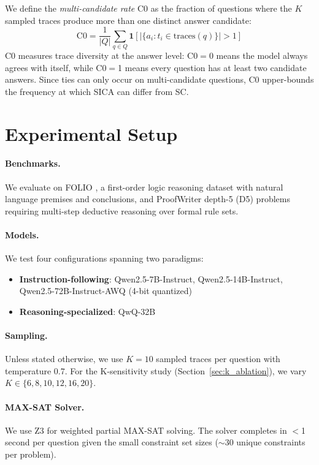 \documentclass[11pt,a4paper]{article}
\begin{document}
We define the \emph{multi-candidate rate} C0 as the fraction of questions where the $K$ sampled traces produce more than one distinct answer candidate:
\begin{equation}
    \text{C0} = \frac{1}{|Q|} \sum_{q \in Q} \mathbf{1}\left[|\{a_i : t_i \in \text{traces}(q)\}| > 1\right]
\end{equation}
C0 measures trace diversity at the answer level: C0$=$0 means the model always agrees with itself, while C0$=$1 means every question has at least two candidate answers. Since ties can only occur on multi-candidate questions, C0 upper-bounds the frequency at which SICA can differ from SC.

\section{Experimental Setup}
\label{sec:setup}

\paragraph{Benchmarks.} We evaluate on FOLIO \cite{han2022folio}, a first-order logic reasoning dataset with natural language premises and conclusions, and ProofWriter \cite{tafjord2021proofwriter} depth-5 (D5) problems requiring multi-step deductive reasoning over formal rule sets.

\paragraph{Models.} We test four configurations spanning two paradigms:
\begin{itemize}
    \item \textbf{Instruction-following}: Qwen2.5-7B-Instruct, Qwen2.5-14B-Instruct, Qwen2.5-72B-Instruct-AWQ (4-bit quantized)
    \item \textbf{Reasoning-specialized}: QwQ-32B
\end{itemize}

\paragraph{Sampling.} Unless stated otherwise, we use $K{=}10$ sampled traces per question with temperature 0.7. For the K-sensitivity study (Section~\ref{sec:k_ablation}), we vary $K \in \{6, 8, 10, 12, 16, 20\}$.

\paragraph{MAX-SAT Solver.} We use Z3 for weighted partial MAX-SAT solving. The solver completes in $<$1 second per question given the small constraint set sizes ($\sim$30 unique constraints per problem).
\end{document}
